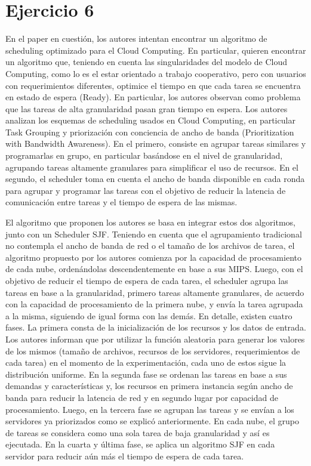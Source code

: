 \section{Ejercicio 6}

En el paper en cuestión, los autores intentan encontrar un algoritmo de scheduling optimizado para el Cloud Computing. En particular, quieren encontrar un algoritmo que, teniendo en cuenta las singularidades del modelo de Cloud Computing, como lo es el estar orientado a trabajo cooperativo, pero con usuarios con requerimientos diferentes, optimice el tiempo en que cada tarea se encuentra en estado de espera (Ready). En particular, los autores observan como problema que las tareas de alta granularidad pasan gran tiempo en espera.
Los autores analizan los esquemas de scheduling usados en Cloud Computing, en particular Task Grouping y priorización con conciencia de ancho de banda (Prioritization with Bandwidth Awareness). En el primero, consiste en agrupar tareas similares y programarlas en grupo, en particular basándose en el nivel de granularidad, agrupando tareas altamente granulares para simplificar el uso de recursos. En el segundo, el scheduler toma en cuenta el ancho de banda disponible en cada ronda para agrupar y programar las tareas con el objetivo de reducir la latencia de comunicación entre tareas y el tiempo de espera de las mismas.

El algoritmo que proponen los autores se basa en integrar estos dos algoritmos, junto con un Scheduler SJF. Teniendo en cuenta que el agrupamiento tradicional no contempla el ancho de banda de red o el tamaño de los archivos de tarea, el algoritmo propuesto por los autores comienza por la capacidad de procesamiento de cada nube, ordenándolas descendentemente en base a sus MIPS. Luego, con el objetivo de reducir el tiempo de espera de cada tarea, el scheduler agrupa las tareas en base a la granularidad, primero tareas altamente granulares, de acuerdo con la capacidad de procesamiento de la primera nube, y envía la tarea agrupada a la misma, siguiendo de igual forma con las demás.	
En detalle, existen cuatro fases. La primera consta de la inicialización de los recursos y los datos de entrada. Los autores informan que por utilizar la función aleatoria para generar los valores de los mismos (tamaño de archivos, recursos de los servidores, requerimientos de cada tarea) en el momento de la experimentación, cada uno de estos sigue la distribución uniforme. En la segunda fase se ordenan las tareas en base a sus demandas y características y, los recursos en primera instancia según ancho de banda para reducir la latencia de red y en segundo lugar por capacidad de procesamiento. Luego, en la tercera fase se agrupan las tareas y se envían a los servidores ya priorizados como se explicó anteriormente. En cada nube, el grupo de tareas se considera como una sola tarea de baja granularidad y así es ejecutada. En la cuarta y última fase, se aplica un algoritmo SJF en cada servidor para reducir aún más el tiempo de espera de cada tarea.

